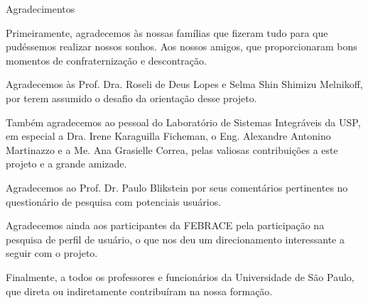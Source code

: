 
\begin{titlepage}
  \begin{center}
    {\ABNTchaptersize\ABNTchapterfont Agradecimentos}
  \end{center}

Primeiramente, agradecemos às nossas famílias que fizeram tudo para que pudéssemos realizar nossos sonhos. Aos nossos amigos, que proporcionaram bons momentos de confraternização e descontração.

Agradecemos às Prof. Dra. Roseli de Deus Lopes e Selma Shin Shimizu Melnikoff, por terem assumido o desafio da orientação desse projeto.

Também agradecemos ao pessoal do Laboratório de Sistemas Integráveis da USP, em especial a Dra. Irene Karaguilla Ficheman, o Eng. Alexandre Antonino Martinazzo e a Me. Ana Grasielle Correa, pelas valiosas contribuições a este projeto e a grande amizade. 

Agradecemos ao Prof. Dr. Paulo Blikstein por seus comentários pertinentes no questionário de pesquisa com potenciais usuários.

Agradecemos ainda aos participantes da FEBRACE pela participação na pesquisa de perfil de usuário, o que nos deu um direcionamento interessante a seguir com o projeto.

Finalmente, a todos os professores e funcionários da Universidade de São Paulo, que direta ou indiretamente contribuíram na nossa formação.

\end{titlepage}

